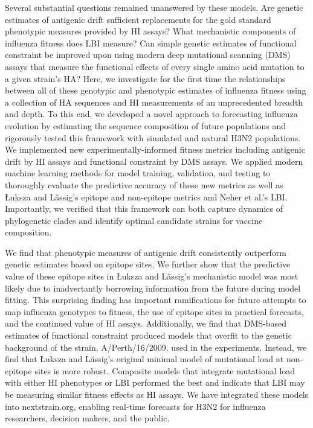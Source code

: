 \documentclass[stdletter,letterpaper,addrfromright,orderfromdateto,dateleft,11pt,noaddrto,sigleft]{newlfm}
\begin{document}
\begin{newlfm}
  Several substantial questions remained unanswered by these models.
  Are genetic estimates of antigenic drift sufficient replacements for the gold standard phenotypic measures provided by HI assays?
  What mechanistic components of influenza fitness does LBI measure?
  Can simple genetic estimates of functional constraint be improved upon using modern deep mutational scanning (DMS) assays that measure the functional effects of every single amino acid mutation to a given strain's HA?
  Here, we investigate for the first time the relationships between all of these genotypic and phenotypic estimates of influenza fitness using a collection of HA sequences and HI measurements of an unprecedented breadth and depth.
  To this end, we developed a novel approach to forecasting influenza evolution by estimating the sequence composition of future populations and rigorously tested this framework with simulated and natural H3N2 populations.
  We implemented new experimentally-informed fitness metrics including antigenic drift by HI assays and functional constraint by DMS assays.
  We applied modern machine learning methods for model training, validation, and testing to thoroughly evaluate the predictive accuracy of these new metrics as well as {\L}uksza and L\"assig's epitope and non-epitope metrics and Neher et al.'s LBI.
  Importantly, we verified that this framework can both capture dynamics of phylogenetic clades and identify optimal candidate strains for vaccine composition.

  We find that phenotypic measures of antigenic drift consistently outperform genetic estimates based on epitope sites.
  We further show that the predictive value of these epitope sites in {\L}uksza and L\"assig's mechanistic model was most likely due to inadvertantly borrowing information from the future during model fitting.
  This surprising finding has important ramifications for future attempts to map influenza genotypes to fitness, the use of epitope sites in practical forecasts, and the continued value of HI assays.
  Additionally, we find that DMS-based estimates of functional constraint produced models that overfit to the genetic background of the strain, A/Perth/16/2009, used in the experiments.
  Instead, we find that {\L}uksza and L\"assig's original minimal model of mutational load at non-epitope sites is more robust.
  Composite models that integrate mutational load with either HI phenotypes or LBI performed the best and indicate that LBI may be measuring similar fitness effects as HI assays.
  We have integrated these models into nextstrain.org, enabling real-time forecasts for H3N2 for influenza researchers, decision makers, and the public.


\end{newlfm}
\end{document}
